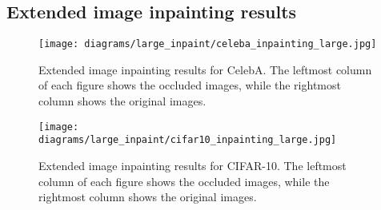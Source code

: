 \documentclass{article}
\begin{document}
\subsection{Extended image inpainting results}\label{app:inpainting}
\vspace*{\fill}
\FloatBarrier
\begin{figure}[H]
    \centering
    \texttt{[image: diagrams/large\_inpaint/celeba\_inpainting\_large.jpg]}
    \caption{Extended image inpainting results for CelebA. The leftmost column of each figure shows the occluded images, while the rightmost column shows the original images.}
\end{figure}
\FloatBarrier
\vfill
\newpage
\vspace*{\fill}
\FloatBarrier
\begin{figure}[H]
    \centering
    \texttt{[image: diagrams/large\_inpaint/cifar10\_inpainting\_large.jpg]}
    \caption{Extended image inpainting results for CIFAR-10. The leftmost column of each figure shows the occluded images, while the rightmost column shows the original images.}
\end{figure}
\FloatBarrier
\vfill 
\end{document}

